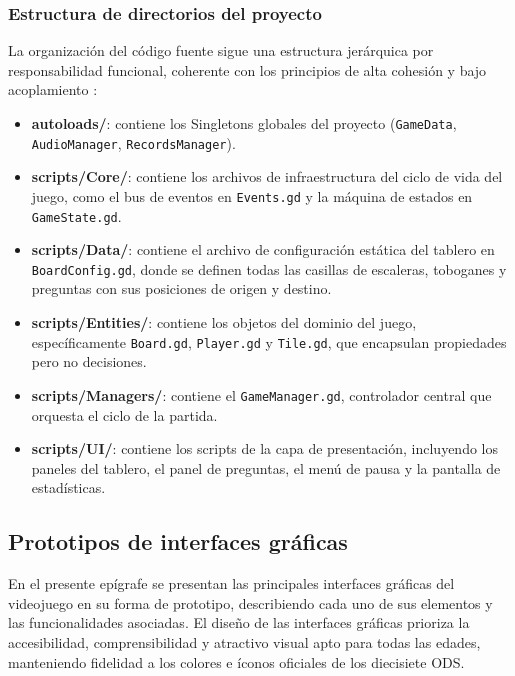 \subsubsection{Estructura de directorios del proyecto}
\label{subsubsec:capas}

La organización del código fuente sigue una estructura jerárquica por responsabilidad funcional, coherente con los principios de alta cohesión y bajo acoplamiento \parencite{Pressman2019}:

\begin{itemize}
    \item \textbf{autoloads/}: contiene los Singletons globales del proyecto (\texttt{GameData}, \texttt{AudioManager}, \texttt{RecordsManager}).
    \item \textbf{scripts/Core/}: contiene los archivos de infraestructura del ciclo de vida del juego, como el bus de eventos en \texttt{Events.gd} y la m\'aquina de estados en \texttt{GameState.gd}.
    \item \textbf{scripts/Data/}: contiene el archivo de configuración estática del tablero en \texttt{BoardConfig.gd}, donde se definen todas las casillas de escaleras, toboganes y preguntas con sus posiciones de origen y destino.
    \item \textbf{scripts/Entities/}: contiene los objetos del dominio del juego, específicamente \texttt{Board.gd}, \texttt{Player.gd} y \texttt{Tile.gd}, que encapsulan propiedades pero no decisiones.
    \item \textbf{scripts/Managers/}: contiene el \texttt{GameManager.gd}, controlador central que orquesta el ciclo de la partida.
    \item \textbf{scripts/UI/}: contiene los scripts de la capa de presentación, incluyendo los paneles del tablero, el panel de preguntas, el menú de pausa y la pantalla de estadísticas.
\end{itemize}

\subsection{Prototipos de interfaces gráficas}
\label{subsec:prototipos}

En el presente epígrafe se presentan las principales interfaces gráficas del videojuego en su forma de prototipo, describiendo cada uno de sus elementos y las funcionalidades asociadas. El diseño de las interfaces gráficas prioriza la accesibilidad, comprensibilidad y atractivo visual apto para todas las edades, manteniendo fidelidad a los colores e íconos oficiales de los diecisiete ODS.

